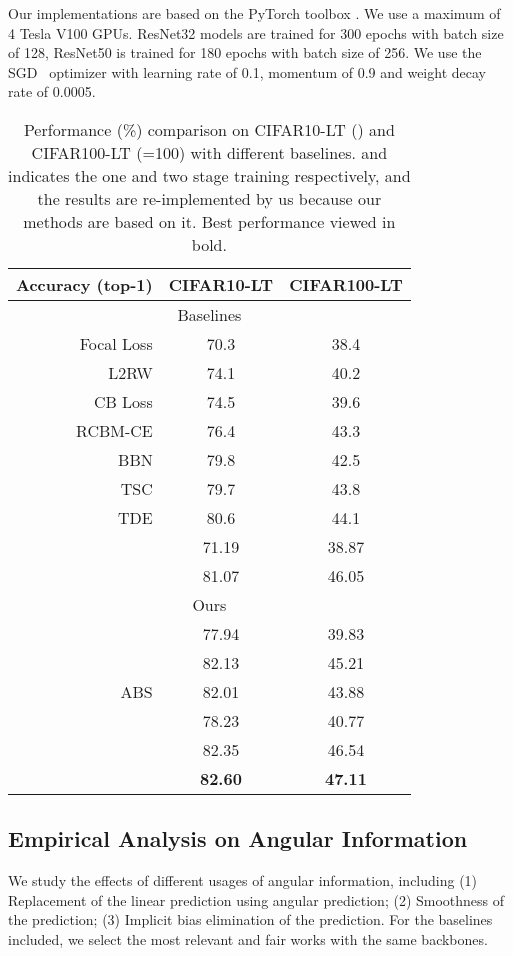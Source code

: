 \documentclass[10pt,twocolumn,letterpaper]{article}
\begin{document}
Our implementations are based on the PyTorch toolbox \cite{pytorch}. We use a maximum of 4 Tesla V100 GPUs. ResNet32 models are trained for 300 epochs with batch size of 128, ResNet50 is trained for 180 epochs with batch size of 256. We use the SGD~\cite{sgd} optimizer with learning rate of 0.1, momentum of 0.9 and weight decay rate of 0.0005. 

\begin{table}[tb!]
\centering\caption{Performance (\%) comparison on CIFAR10-LT () and CIFAR100-LT (=100) with different baselines.  and  indicates the one and two stage training respectively, and the results are re-implemented by us because our methods are based on it. Best performance viewed in bold.}\vspace{-5pt}
\begin{tabular}{rcc}
\hline
Accuracy (top-1)  & CIFAR10-LT & CIFAR100-LT  \\ 
\hline \hline
\multicolumn{3}{c}{Baselines}   \\ \hline 
Focal Loss \cite{focalloss}  & 70.3   & 38.4  \\ \hline
L2RW  \cite{L2RW}      & 74.1   & 40.2  \\ \hline
CB Loss \cite{cbloss}    & 74.5   & 39.6  \\ \hline
RCBM-CE \cite{RCBM-CE}    & 76.4   & 43.3  \\ \hline
BBN  \cite{bbn}       & 79.8   & 42.5  \\ \hline
TSC  \cite{TSC}       & 79.7   & 43.8   \\ \hline
TDE \cite{tde}        & 80.6   & 44.1   \\ \hline
~\cite{mislas}  & 71.19 & 38.87 \\ \hline
~\cite{mislas}  & 81.07 & 46.05 \\ \hline \hline
\multicolumn{3}{c}{Ours}        \\ \hline
  & 77.94  & 39.83  \\ 
   & 82.13  & 45.21  \\ \hline
ABS    &  82.01 &   43.88  \\ \hline
    &  78.23  &  40.77   \\ 
   &  82.35  &  46.54  \\ 
 & \textbf{82.60} & \textbf{47.11}  \\ \hline
\end{tabular}
\label{tab:cifar_baseline}
\end{table}

\subsection{Empirical Analysis on Angular Information}
We study the effects of different usages of angular information, including (1) Replacement of the linear prediction using angular prediction; (2) Smoothness of the  prediction; (3) Implicit bias elimination of the prediction. For the baselines included, we select the most relevant and fair works with the same backbones.
\end{document}
